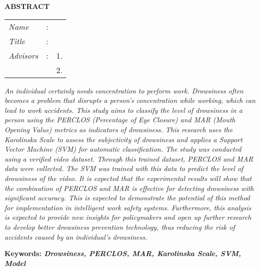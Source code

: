\begin{center}
  \large\textbf{ABSTRACT}
\end{center}


\vspace{2ex}

\begingroup
\setlength{\tabcolsep}{0pt}

\noindent
\begin{tabularx}{\textwidth}{l >{\centering}m{3em} X}
  \emph{Name}     & : & \name{}         \\

  \emph{Title}    & : & \engtatitle{}   \\

  \emph{Advisors} & : & 1. \advisor{}   \\
                  &   & 2. \coadvisor{} \\
\end{tabularx}
\endgroup

\emph{An individual certainly needs concentration to perform work. Drowsiness often becomes a problem that disrupts a person's concentration while working, which can lead to work accidents. This study aims to classify the level of drowsiness in a person using the PERCLOS (Percentage of Eye Closure) and MAR (Mouth Opening Value) metrics as indicators of drowsiness. This research uses the Karolinska Scale to assess the subjectivity of drowsiness and applies a Support Vector Machine (SVM) for automatic classification. The study was conducted using a verified video dataset. Through this trained dataset, PERCLOS and MAR data were collected. The SVM was trained with this data to predict the level of drowsiness of the video. It is expected that the experimental results will show that the combination of PERCLOS and MAR is effective for detecting drowsiness with significant accuracy. This is expected to demonstrate the potential of this method for implementation in intelligent work safety systems. Furthermore, this analysis is expected to provide new insights for policymakers and open up further research to develop better drowsiness prevention technology, thus reducing the risk of accidents caused by an individual's drowsiness.}

\vspace{2ex}
\noindent
\textbf{Keywords: \emph{Drowsiness, PERCLOS, MAR, Karolinska Scale, SVM, Model}}
